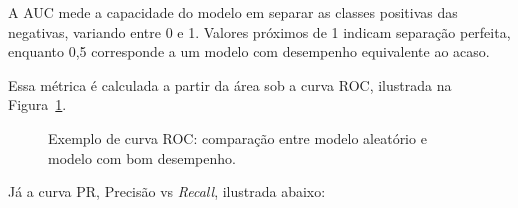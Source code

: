 \documentclass[
    12pt,                %
    openright,           %
    oneside,             %
    a4paper,             %
    brazil               %
]{abntex2}
\begin{document}
A AUC mede a capacidade do modelo em separar as classes positivas das negativas, variando entre 0 e 1. Valores próximos de 1 indicam separação perfeita, enquanto 0,5 corresponde a um modelo com desempenho equivalente ao acaso. 

Essa métrica é calculada a partir da área sob a curva ROC, ilustrada na Figura~\ref{fig:roc}.


\begin{figure}[H]
    \centering
    \caption{Exemplo de curva ROC: comparação entre modelo aleatório e modelo com bom desempenho.}
    \label{fig:roc}
\end{figure}

Já a curva PR, Precisão vs \textit{Recall}, ilustrada abaixo:


\pgfplotsset{compat=1.18}
\end{document}
